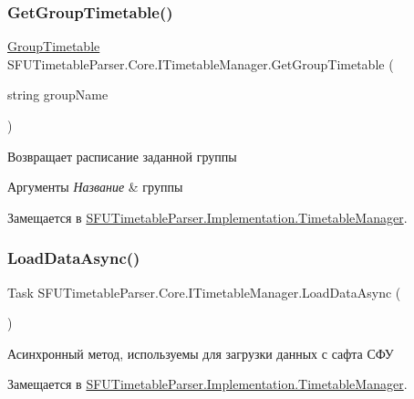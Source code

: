 \subsubsection{\texorpdfstring{Get\+Group\+Timetable()}{GetGroupTimetable()}}
{\footnotesize\ttfamily \hyperlink{class_s_f_u_timetable_parser_1_1_core_1_1_entities_1_1_group_timetable}{Group\+Timetable} S\+F\+U\+Timetable\+Parser.\+Core.\+I\+Timetable\+Manager.\+Get\+Group\+Timetable (\begin{DoxyParamCaption}\item[{string}]{group\+Name }\end{DoxyParamCaption})}



Возвращает расписание заданной группы 


\begin{DoxyParams}{Аргументы}
{\em Название} & группы \\
\hline
\end{DoxyParams}


Замещается в \hyperlink{class_s_f_u_timetable_parser_1_1_implementation_1_1_timetable_manager_a23e17cd28ece08c67288e569380c9602}{S\+F\+U\+Timetable\+Parser.\+Implementation.\+Timetable\+Manager}.

\mbox{\label{interface_s_f_u_timetable_parser_1_1_core_1_1_i_timetable_manager_a4bc85e98ca57c83c9fa433036f064016}} 
\subsubsection{\texorpdfstring{Load\+Data\+Async()}{LoadDataAsync()}}
{\footnotesize\ttfamily Task S\+F\+U\+Timetable\+Parser.\+Core.\+I\+Timetable\+Manager.\+Load\+Data\+Async (\begin{DoxyParamCaption}{ }\end{DoxyParamCaption})}

Асинхронный метод, используемы для загрузки данных с сафта СФУ 

Замещается в \hyperlink{class_s_f_u_timetable_parser_1_1_implementation_1_1_timetable_manager_a68266c332dfb29c133aaa36afd29385f}{S\+F\+U\+Timetable\+Parser.\+Implementation.\+Timetable\+Manager}.



